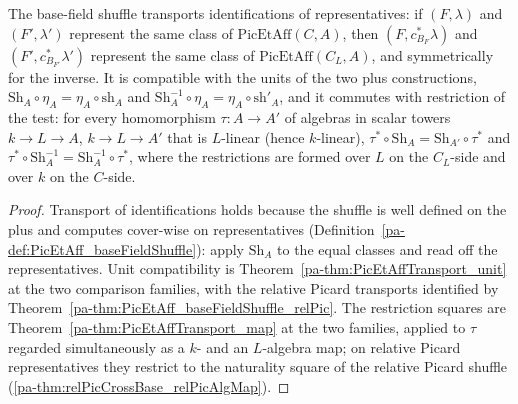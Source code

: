 \begin{theorem}
  \label{pa-thm:PicEtAff_baseFieldShuffle_laws}
  \leanok

  The base-field shuffle transports identifications of representatives: if
  \((F, \lambda)\) and \((F', \lambda')\) represent the same class of
  \(\mathrm{PicEtAff}(C, A)\), then \((F, c_{B_F}^{*}\lambda)\) and
  \((F', c_{B_{F'}}^{*}\lambda')\) represent the same class of
  \(\mathrm{PicEtAff}(C_L, A)\), and symmetrically for the inverse. It is compatible
  with the units of the two plus constructions,
  \(\mathrm{Sh}_A \circ \eta_A = \eta_A \circ \mathrm{sh}_A\) and
  \(\mathrm{Sh}_A^{-1} \circ \eta_A = \eta_A \circ \mathrm{sh}'_A\), and it commutes
  with restriction of the test: for every homomorphism \(\tau \colon A \to A'\) of
  algebras in scalar towers \(k \to L \to A\), \(k \to L \to A'\) that is \(L\)-linear
  (hence \(k\)-linear),
  \(\tau^{*} \circ \mathrm{Sh}_A = \mathrm{Sh}_{A'} \circ \tau^{*}\) and
  \(\tau^{*} \circ \mathrm{Sh}_A^{-1} = \mathrm{Sh}_A^{-1} \circ \tau^{*}\), where the
  restrictions are formed over \(L\) on the \(C_L\)-side and over \(k\) on the
  \(C\)-side.
\end{theorem}
\begin{proof}
  \leanok
  Transport of identifications holds because the shuffle is well defined on the plus and
  computes cover-wise on representatives
  (Definition~\ref{pa-def:PicEtAff_baseFieldShuffle}): apply \(\mathrm{Sh}_A\) to the equal
  classes and read off the representatives. Unit compatibility is
  Theorem~\ref{pa-thm:PicEtAffTransport_unit} at the two comparison families, with the
  relative Picard transports identified by
  Theorem~\ref{pa-thm:PicEtAff_baseFieldShuffle_relPic}. The restriction squares are
  Theorem~\ref{pa-thm:PicEtAffTransport_map} at the two families, applied to \(\tau\)
  regarded simultaneously as a \(k\)- and an \(L\)-algebra map; on relative Picard
  representatives they restrict to the naturality square of the relative Picard shuffle
  (\ref{pa-thm:relPicCrossBase_relPicAlgMap}).
\end{proof}


